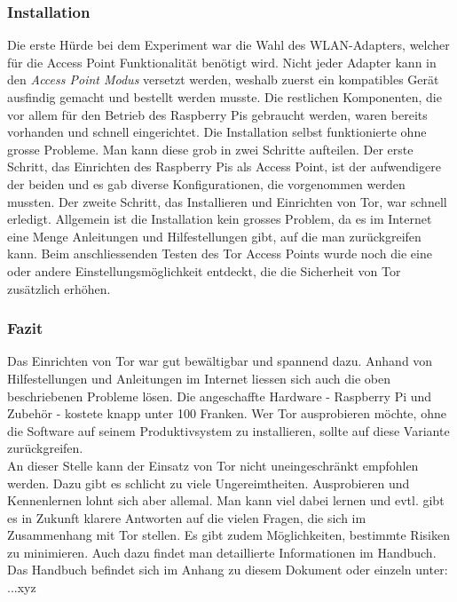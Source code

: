 \subsubsection{Installation}
Die erste Hürde bei dem Experiment war die Wahl des WLAN-Adapters, welcher für die Access Point Funktionalität benötigt wird. Nicht jeder Adapter kann in den \textit{Access Point Modus} versetzt werden, weshalb zuerst ein kompatibles Gerät ausfindig gemacht und bestellt werden musste. Die restlichen Komponenten, die vor allem für den Betrieb des Raspberry Pis gebraucht werden, waren bereits vorhanden und schnell eingerichtet. Die Installation selbst funktionierte ohne grosse Probleme. Man kann diese grob in zwei Schritte aufteilen. Der erste Schritt, das Einrichten des Raspberry Pis als Access Point, ist der aufwendigere der beiden und es gab diverse Konfigurationen, die vorgenommen werden mussten. Der zweite Schritt, das Installieren und Einrichten von Tor, war schnell erledigt. Allgemein ist die Installation kein grosses Problem, da es im Internet eine Menge Anleitungen und Hilfestellungen gibt, auf die man zurückgreifen kann. Beim anschliessenden Testen des Tor Access Points wurde noch die eine oder andere Einstellungsmöglichkeit entdeckt, die die Sicherheit von Tor zusätzlich erhöhen.

\subsubsection{Fazit}
Das Einrichten von Tor war gut bewältigbar und spannend dazu. Anhand von Hilfestellungen und Anleitungen im Internet liessen sich auch die oben beschriebenen Probleme lösen. Die angeschaffte Hardware - Raspberry Pi und Zubehör - kostete knapp unter 100 Franken. Wer Tor ausprobieren möchte, ohne die Software auf seinem Produktivsystem zu installieren, sollte auf diese Variante zurückgreifen.
\\
An dieser Stelle kann der Einsatz von Tor nicht uneingeschränkt empfohlen werden. Dazu gibt es schlicht zu viele Ungereimtheiten. Ausprobieren und Kennenlernen lohnt sich aber allemal. Man kann viel dabei lernen und evtl. gibt es in Zukunft klarere Antworten auf die vielen Fragen, die sich im Zusammenhang mit Tor stellen. Es gibt zudem Möglichkeiten, bestimmte Risiken zu minimieren. Auch dazu findet man detaillierte Informationen im Handbuch.
\\
Das Handbuch befindet sich im Anhang zu diesem Dokument oder einzeln unter: ...xyz
